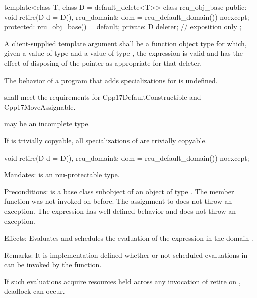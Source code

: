 \begin{codeblock}
template<class T, class D = default_delete<T>>
class rcu_obj_base {
public:
  void retire(D d = D(), rcu_domain& dom = rcu_default_domain()) noexcept;
protected:
  rcu_obj_base() = default;
private:
  D deleter;  // exposition only
};
\end{codeblock}

\pnum
A client-supplied template argument  shall be a
function object type  for which,
given a value  of type  and a value 
of type , the expression  is valid and
has the effect of disposing of the pointer as appropriate for
that deleter.

\pnum
The behavior of a program that adds specializations for
 is undefined.

\pnum
{} shall meet the requirements for
Cpp17DefaultConstructible and Cpp17MoveAssignable.

\pnum
{} may be an incomplete type.

\pnum
If  is trivially copyable, all specializations of
 are trivially copyable.

\begin{codeblock}
void retire(D d = D(), rcu_domain& dom = rcu_default_domain()) noexcept;
\end{codeblock}

\pnum
Mandates:  is an rcu-protectable type.

\pnum
Preconditions:  is a base class subobject of
an object  of type . The member function
 was not invoked on 
before. The assignment to  does not throw an
exception. The expression  has
well-defined behavior and does not throw an exception.

\pnum	Effects: Evaluates  and schedules
the evaluation of the expression 
in the domain .

\pnum	Remarks: It is implementation-defined whether or not scheduled
evaluations in  can be invoked by the 
function.
\begin{note}
If such evaluations acquire resources held across any invocation of
retire on , deadlock can occur.
\end{note}

